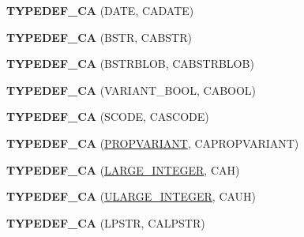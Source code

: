 \begin{DoxyCompactItemize}
{\bfseries T\+Y\+P\+E\+D\+E\+F\+\_\+\+CA} (D\+A\+TE, C\+A\+D\+A\+TE)
\item 
\mbox{\label{interface_i_property_storage_a58309886df4203359582cd24fa16579e}} 
{\bfseries T\+Y\+P\+E\+D\+E\+F\+\_\+\+CA} (B\+S\+TR, C\+A\+B\+S\+TR)
\item 
\mbox{\label{interface_i_property_storage_ada9ba6ee9d75abc558555753a7e1be5a}} 
{\bfseries T\+Y\+P\+E\+D\+E\+F\+\_\+\+CA} (B\+S\+T\+R\+B\+L\+OB, C\+A\+B\+S\+T\+R\+B\+L\+OB)
\item 
\mbox{\label{interface_i_property_storage_accaef4dc9676edafbc0c30de44c07706}} 
{\bfseries T\+Y\+P\+E\+D\+E\+F\+\_\+\+CA} (V\+A\+R\+I\+A\+N\+T\+\_\+\+B\+O\+OL, C\+A\+B\+O\+OL)
\item 
\mbox{\label{interface_i_property_storage_ace47e21c433276288cf6c288d8cda020}} 
{\bfseries T\+Y\+P\+E\+D\+E\+F\+\_\+\+CA} (S\+C\+O\+DE, C\+A\+S\+C\+O\+DE)
\item 
\mbox{\label{interface_i_property_storage_a34fdf5c0bcff7016886ce36e042fe508}} 
{\bfseries T\+Y\+P\+E\+D\+E\+F\+\_\+\+CA} (\hyperlink{struct_i_property_storage_1_1tag_p_r_o_p_v_a_r_i_a_n_t}{P\+R\+O\+P\+V\+A\+R\+I\+A\+NT}, C\+A\+P\+R\+O\+P\+V\+A\+R\+I\+A\+NT)
\item 
\mbox{\label{interface_i_property_storage_a52387ded693afa49522e6d1c818321bf}} 
{\bfseries T\+Y\+P\+E\+D\+E\+F\+\_\+\+CA} (\hyperlink{union___l_a_r_g_e___i_n_t_e_g_e_r}{L\+A\+R\+G\+E\+\_\+\+I\+N\+T\+E\+G\+ER}, C\+AH)
\item 
\mbox{\label{interface_i_property_storage_a82667ce757e05bb1bac61e27db44146d}} 
{\bfseries T\+Y\+P\+E\+D\+E\+F\+\_\+\+CA} (\hyperlink{struct___u_l_a_r_g_e___i_n_t_e_g_e_r}{U\+L\+A\+R\+G\+E\+\_\+\+I\+N\+T\+E\+G\+ER}, C\+A\+UH)
\item 
\mbox{\label{interface_i_property_storage_a1da41fc0ac7a81b3c042fdd3527cc4f6}} 
{\bfseries T\+Y\+P\+E\+D\+E\+F\+\_\+\+CA} (L\+P\+S\+TR, C\+A\+L\+P\+S\+TR)
\item 

\end{DoxyCompactItemize}
